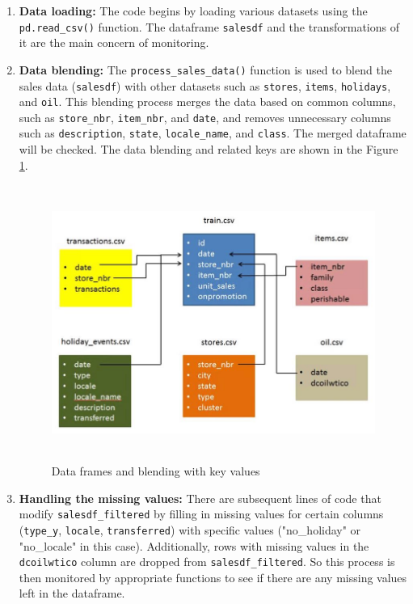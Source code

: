 \begin{enumerate}
	
	\item \textbf{Data loading:} The code begins by loading various datasets using the \texttt{pd.read\_csv()} function. The dataframe \texttt{salesdf} and the transformations of it are the main concern of monitoring.
	
	\item \textbf{Data blending:} The \texttt{process\_sales\_data()} function is used to blend the sales data (\texttt{salesdf}) with other datasets such as \texttt{stores}, \texttt{items}, \texttt{holidays}, and \texttt{oil}. This blending process merges the data based on common columns, such as \texttt{store\_nbr}, \texttt{item\_nbr}, and \texttt{date}, and removes unnecessary columns such as \texttt{description}, \texttt{state}, \texttt{locale\_name}, and \texttt{class}. The merged dataframe will be checked. The data blending and related keys are shown in the Figure \ref{DataBlending}.
	
	\begin{center}
		\begin{figure}[h!]
			\begin{center}
				\includegraphics[height=90mm, width=130mm]{Images/DataBlending.jpg}
			\end{center}
			\caption{Data frames and blending with key values \cite{Kaggle:2023}}\label{DataBlending}
		\end{figure}
	\end{center}
	
	\item \textbf{Handling the missing values:} There are subsequent lines of code that modify \texttt{salesdf\_filtered} by filling in missing values for certain columns (\texttt{type\_y}, \texttt{locale}, \texttt{transferred}) with specific values ("no\_holiday" or\\ "no\_locale" in this case). Additionally, rows with missing values in the \texttt{dcoilwtico} column are dropped from \texttt{salesdf\_filtered}. So this process is then monitored by appropriate functions to see if there are any missing values left in the dataframe.
	

\end{enumerate}

